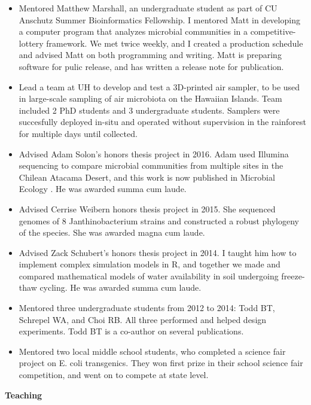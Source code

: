 \documentclass{article}
\begin{document}
\begin{itemize}[noitemsep,topsep=0pt, leftmargin=5mm]
  \item Mentored Matthew Marshall, an undergraduate student as part of CU Anschutz Summer Bioinformatics Fellowship. I mentored Matt in developing a computer program that analyzes microbial communities in a competitive-lottery framework. We met twice weekly, and I created a production schedule and advised Matt on both programming and writing. Matt is preparing software for pulic release, and has written a release note for publication.
  \item Lead a team at UH to develop and test a 3D-printed air sampler, to be used in large-scale sampling of air microbiota on the Hawaiian Islands. Team included 2 PhD students and 3 undergraduate students. Samplers were succesfully deployed in-situ and operated without supervision in the rainforest for multiple days until collected.
  \item Advised Adam Solon's honors thesis project in 2016. Adam used Illumina sequencing to compare microbial communities from multiple sites in the Chilean Atacama Desert, and this work is now published in Microbial Ecology \cite{Solon2018}. He was awarded summa cum laude.
  \item Advised Cerrise Weibern honors thesis project in 2015. She sequenced genomes of 8 Janthinobacterium strains and constructed a robust phylogeny of the species. She was awarded magna cum laude.
  \item Advised Zack Schubert's honors thesis project in 2014. I taught him how to implement complex simulation models in R, and together we made and compared mathematical models of water availability in soil undergoing freeze-thaw cycling. He was awarded summa cum laude.
  \item Mentored three undergraduate students from 2012 to 2014: Todd BT, Schrepel WA, and Choi RB. All three performed and helped design experiments. Todd BT is a co-author on several publications.
  \item Mentored two local middle school students, who completed a science fair project on E. coli transgenics. They won first prize in their school science fair competition, and went on to compete at state level.
\end{itemize}
\vspace{3mm}
{\large  \textbf{Teaching}}
\end{document}
